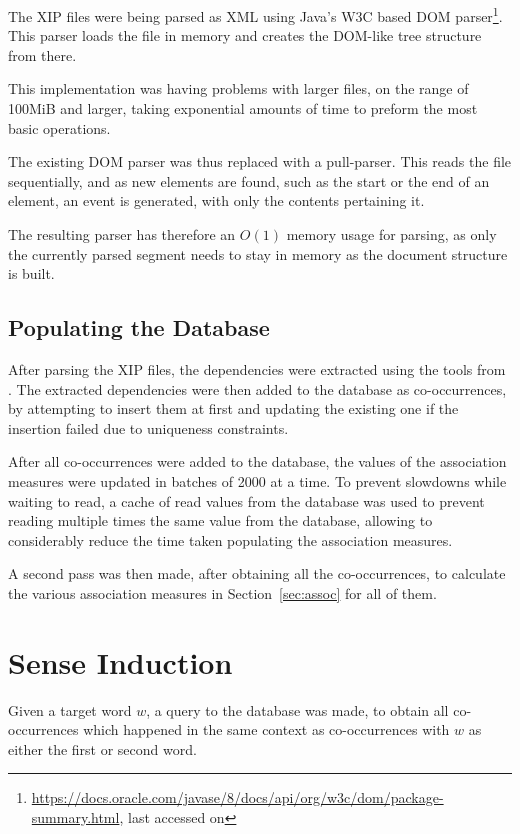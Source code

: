 The \ac{XIP} files were being parsed as XML using Java's W3C based \ac{DOM}
parser\footnote{\url{https://docs.oracle.com/javase/8/docs/api/org/w3c/dom/package-summary.html},
last accessed on }. This parser loads the file in memory and
creates the \ac{DOM}-like tree structure from there.

This implementation was having problems with larger files, on the range of
100MiB and larger, taking exponential amounts of time to preform the most basic
operations.

The existing \ac{DOM} parser was thus replaced with a pull-parser. This reads
the file sequentially, and as new elements are found, such as the start or the
end of an element, an event is generated, with only the contents pertaining it.

The resulting parser has therefore an $O(1)$ memory usage for parsing, as only
the currently parsed segment needs to stay in memory as the document structure
is built.

\subsection{Populating the Database}

After parsing the \ac{XIP} files, the dependencies were extracted using the
tools from \cite{correia2015syntax}. The extracted dependencies were then added
to the database as co-occurrences, by attempting to insert them at first and
updating the existing one if the insertion failed due to uniqueness constraints.

After all co-occurrences were added to the database, the values of the
association measures were updated in batches of 2000 at a time. To prevent
slowdowns while waiting to read, a cache of read values from the database was
used to prevent reading multiple times the same value from the database,
allowing to considerably reduce the time taken populating the association
measures.

A second pass was then made, after obtaining all the co-occurrences, to
calculate the various association measures in Section~\ref{sec:assoc} for all of
them.

\section{Sense Induction}

Given a target word $w$, a query to the database was made, to obtain all
co-occurrences which happened in the same context as co-occurrences with $w$ as
either the first or second word.

